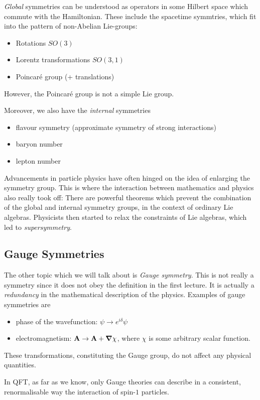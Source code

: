 \begin{definition}
  \emph{Global} symmetries can be understood as operators in some Hilbert space which commute with the Hamiltonian.
  These include the spacetime symmtries, which fit into the pattern of non-Abelian Lie-groups:
  \begin{itemize}
    \item Rotations $SO(3)$
    \item Lorentz transformations $SO(3, 1)$
    \item Poincar\'e group (+ translations)
  \end{itemize}
  However, the Poincar\'e group is not a simple Lie group. 
\end{definition}
Moreover, we also have the \emph{internal} symmetries
\begin{itemize}
  \item flavour symmetry (approximate symmetry of strong interactions)
  \item baryon number
  \item lepton number
\end{itemize}
Advancements in particle physics have often hinged on the idea of enlarging the symmetry group. This is where the interaction between mathematics and physics also really took off: There are powerful theorems which prevent the combination of the global and internal symmetry groups, in the context of ordinary Lie algebras.
Physicists then started to relax the constraints of Lie algebras, which led to \emph{supersymmetry}.

\subsection*{Gauge Symmetries}%
\label{sub:gauge_symmetries}

The other topic which we will talk about is \emph{Gauge symmetry}. This is not really a symmetry since it does not obey the definition in the first lecture. It is actually a \emph{redundancy} in the mathematical description of the physics.
Examples of gauge symmetries are
\begin{itemize}
  \item phase of the wavefunction: $\psi \to e^{i\delta} \psi$
  \item electromagnetism: $\vb{A} \to \vb{A} + \grad \chi$, where $\chi$ is some arbitrary scalar function.
\end{itemize}
These transformations, constituting the Gauge group, do not affect any physical quantities.
\begin{leftbar}
  \begin{remark}
    In QFT, as far as we know, only Gauge theories can describe in a consistent, renormalisable way the interaction of spin-$1$ particles.
  \end{remark}
\end{leftbar}

